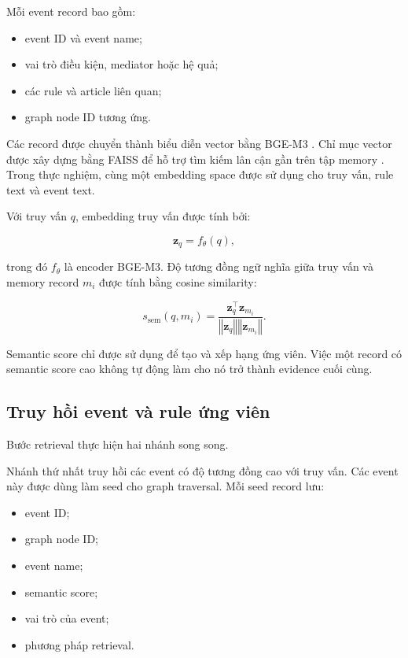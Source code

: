 Mỗi event record bao gồm:

\begin{itemize}
    \item event ID và event name;
    \item vai trò điều kiện, mediator hoặc hệ quả;
    \item các rule và article liên quan;
    \item graph node ID tương ứng.
\end{itemize}

Các record được chuyển thành biểu diễn vector bằng BGE-M3
\cite{chen2024bgem3}. Chỉ mục vector được xây dựng bằng FAISS để hỗ trợ tìm
kiếm lân cận gần trên tập memory
\cite{johnson2019billion}. Trong thực nghiệm, cùng một embedding space được
sử dụng cho truy vấn, rule text và event text.

Với truy vấn \(q\), embedding truy vấn được tính bởi:

\begin{equation}
\mathbf{z}_q
=
f_{\theta}(q),
\end{equation}

trong đó \(f_{\theta}\) là encoder BGE-M3. Độ tương đồng ngữ nghĩa giữa truy
vấn và memory record \(m_i\) được tính bằng cosine similarity:

\begin{equation}
s_{\mathrm{sem}}
\left(
q,m_i
\right)
=
\frac{
    \mathbf{z}_q^\top \mathbf{z}_{m_i}
}{
    \left\Vert\mathbf{z}_q\right\Vert
    \left\Vert\mathbf{z}_{m_i}\right\Vert
}.
\end{equation}

Semantic score chỉ được sử dụng để tạo và xếp hạng ứng viên. Việc một record
có semantic score cao không tự động làm cho nó trở thành evidence cuối cùng.

\subsection{Truy hồi event và rule ứng viên}

Bước retrieval thực hiện hai nhánh song song.

Nhánh thứ nhất truy hồi các event có độ tương đồng cao với truy vấn. Các
event này được dùng làm seed cho graph traversal. Mỗi seed record lưu:

\begin{itemize}
    \item event ID;
    \item graph node ID;
    \item event name;
    \item semantic score;
    \item vai trò của event;
    \item phương pháp retrieval.
\end{itemize}

